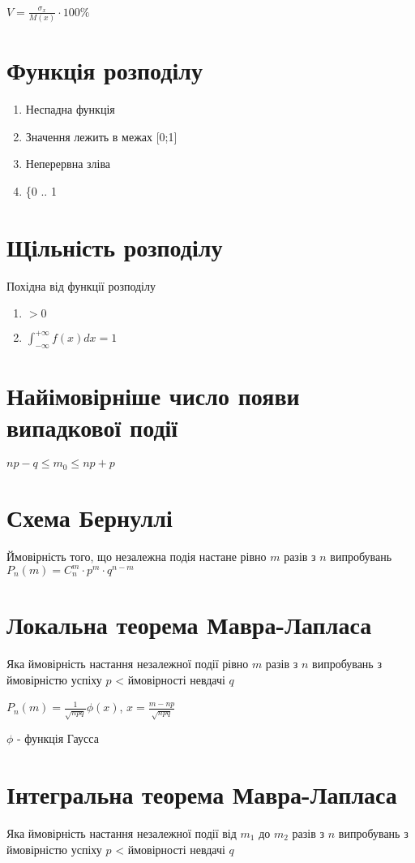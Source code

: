 \documentclass{article}
\begin{document}
\begin{Large}
$V=\frac{\sigma_x}{M(x)}\cdot100\%$

\section*{Функція розподілу}
\begin{enumerate}
	\item Неспадна функція
	\item Значення лежить в межах [0;1]
	\item Неперервна зліва
	\item \{0 .. 1
\end{enumerate}

\section*{Щільність розподілу}
Похідна від функції розподілу

\begin{enumerate}
	\item $> 0$
	\item $\int_{-\infty}^{+\infty}f(x)dx = 1$
\end{enumerate}

\section*{Найімовірніше число появи випадкової події}
$np-q\le m_0 \le np+p$

\section*{Схема Бернуллі}
Ймовірність того, що незалежна подія настане рівно $m$ разів з $n$ випробувань
$P_n(m)=C_n^m\cdot p^m\cdot q^{n-m}$

\section*{Локальна теорема Мавра-Лапласа}
Яка ймовірність настання незалежної події рівно $m$ разів з $n$ випробувань з ймовірністю успіху $p$ < ймовірності невдачі $q$

$P_n(m)=\frac{1}{\sqrt{npq}}\phi(x)$, $x=\frac{m - np}{\sqrt{npq}}$

$\phi$ - функція Гаусса

\section*{Інтегральна теорема Мавра-Лапласа}
Яка ймовірність настання незалежної події від $m_1$ до $m_2$ разів з $n$ випробувань з ймовірністю успіху $p$ < ймовірності невдачі $q$


\end{Large}
\end{document}
